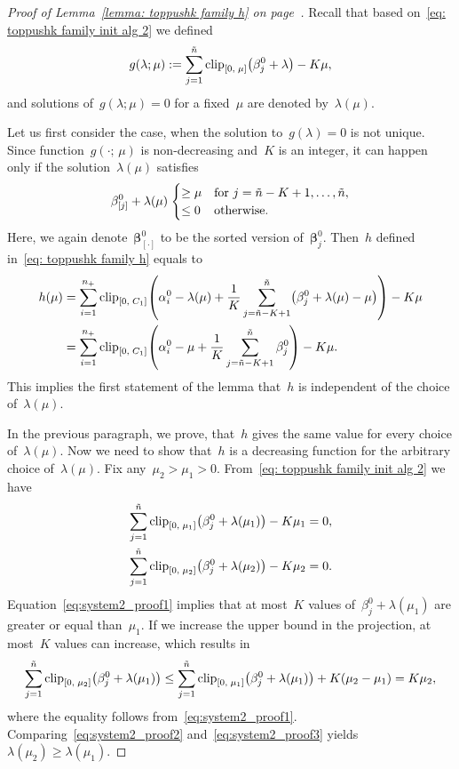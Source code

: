 \topinith*
\begin{proof}[Proof of Lemma~\ref{lemma: toppushk family h} on page~\pageref{lemma: toppushk family h}]
  Recall that based on~\eqref{eq: toppushk family init alg 2} we defined
  \begin{equation*}
    g(\lambda; \mu) := \sum_{j=1}^{\ntil} \clip{0}{\mu}{\beta_j^0 + \lambda} - K \mu,
  \end{equation*}
  and solutions of~$g(\lambda; \mu) = 0$ for a fixed~$\mu$ are denoted by~$\lambda(\mu)$.
  
  Let us first consider the case, when the solution to~$g(\lambda) = 0$ is not unique. Since function~$g(\cdot; \, \mu)$ is non-decreasing and~$K$ is an integer, it can happen only if the solution~$\lambda(\mu)$ satisfies
  \begin{equation*}
    \beta_{[j]}^0 + \lambda(\mu) \;
    \begin{cases}
      \ge \mu & \text{for } j = \ntil - K + 1, \dots , \ntil, \\
      \le 0 & \text{otherwise.}
    \end{cases}
  \end{equation*}
  Here, we again denote~$\bm{\beta}_{[\cdot]}^0$ to be the sorted version of~$\bm{\beta}_j^0$. Then~$h$ defined in~\eqref{eq: toppushk family h} equals to
  \begin{align*}
    h(\mu)
      & = \sum_{i=1}^{\npos} \clip{0}{C_1}{\alpha_i^0 - \lambda(\mu) + \frac{1}{K} \sum_{j=\ntil - K + 1}^{\ntil} \Brac{\beta_j^0+\lambda(\mu) - \mu}} - K \mu \\
      & = \sum_{i=1}^{\npos} \clip{0}{C_1}{\alpha_i^0 - \mu + \frac{1}{K} \sum_{j=\ntil - K + 1}^{\ntil} \beta_j^0} - K \mu.
  \end{align*}
  This implies the first statement of the lemma that~$h$ is independent of the choice of~$\lambda(\mu)$.
  
  In the previous paragraph, we prove, that~$h$ gives the same value for every choice of~$\lambda(\mu).$ Now we need to show that~$h$ is a decreasing function for the arbitrary choice of~$\lambda(\mu).$ Fix any~$\mu_2 > \mu_1 > 0$. From~\eqref{eq: toppushk family init alg 2} we have
  \begin{align}
   \sum_{j=1}^{\ntil} \clip{0}{\mu_1}{\beta_j^0 + \lambda(\mu_1)} - K \mu_1 & = 0,
    \label{eq:system2_proof1} \\
  \sum_{j=1}^{\ntil} \clip{0}{\mu_2}{\beta_j^0 + \lambda(\mu_2)} - K \mu_2 & = 0.
    \label{eq:system2_proof2}
  \end{align}
  Equation~\eqref{eq:system2_proof1} implies that at most~$K$ values of~$\beta_j^0 + \lambda(\mu_1)$ are greater or equal than~$\mu_1$. If we increase the upper bound in the projection, at most~$K$ values can increase, which results in
  \begin{equation}\label{eq:system2_proof3}
    \sum_{j=1}^{\ntil} \clip{0}{\mu_2}{\beta_j^0 + \lambda(\mu_1)}
      \le \sum_{j=1}^{\ntil} \clip{0}{\mu_1}{\beta_j^0 + \lambda(\mu_1)} + K(\mu_2 - \mu_1)
      = K \mu_2,
  \end{equation}
  where the equality follows from~\eqref{eq:system2_proof1}. Comparing~\eqref{eq:system2_proof2} and~\eqref{eq:system2_proof3} yields~$\lambda(\mu_2) \ge \lambda(\mu_1)$.
  

\end{proof}
